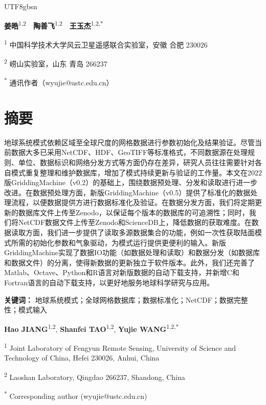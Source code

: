 \documentclass[numdoi]{chinese}
\begin{document}
\doublespacing
\begin{CJK}{UTF8}{gbsn}

%
%
{\centering
\par{}
\normalsize
\par\noindent \textbf{姜皓}\textsuperscript{1,2}　\textbf{陶善飞}\textsuperscript{1,2}　\textbf{王玉杰}\textsuperscript{1,2,*}
\par\noindent \textsuperscript{1} 中国科学技术大学风云卫星遥感联合实验室，安徽 合肥 230026
\par\noindent \textsuperscript{2} 崂山实验室，山东 青岛 266237
\par\noindent \textsuperscript{*} 通讯作者（wyujie@ustc.edu.cn）\\
}


\section*{摘要}
地球系统模式依赖区域至全球尺度的网格数据进行参数初始化及结果验证。尽管当前数据大多已采用NetCDF、HDF、GeoTIFF等标准格式，不同数据源在处理规则、单位、数据标识和网络分发方式等方面仍存在差异，研究人员往往需要针对各自模式重复整理和维护数据库，增加了模式持续更新与验证的工作量。本文在2022版GriddingMachine（v0.2）的基础上，围绕数据预处理、分发和读取进行进一步改进。在数据预处理方面，新版GriddingMachine（v0.5）提供了标准化的数据处理流程，以便数据提供方进行数据标准化及验证。在数据分发方面，我们将定期更新的数据库文件上传至Zenodo，以保证每个版本的数据库的可追溯性；同时，我们将NetCDF数据文件上传至Zenodo和ScienceDB上，降低数据的获取难度。在数据读取方面，我们进一步提供了读取多源数据集合的功能，例如一次性获取陆面模式所需的初始化参数和气象驱动，为模式运行提供更便利的输入。新版GriddingMachine实现了数据IO功能（如数据处理和读取）和数据分发（如数据库和数据文件）的分离，使得新数据的更新独立于软件版本。此外，我们还完善了Matlab、Octave、Python和R语言对新版数据的自动下载支持，并新增C和Fortran语言的自动下载支持，以更好地服务地球科学研究与应用。

\textbf{关键词：} 地球系统模式；全球网格数据库；数据标准化；NetCDF；数据完整性；模式输入


\hspace{10em}
{
\centering
\par{}
\par\noindent \textbf{Hao JIANG}\textsuperscript{1,2}, \textbf{Shanfei TAO}\textsuperscript{1,2}, \textbf{Yujie WANG}\textsuperscript{1,2,*}
\par\noindent \textsuperscript{1} Joint Laboratory of Fengyun Remote Sensing, University of Science and Technology of China, Hefei 230026, Anhui, China
\par\noindent \textsuperscript{2} Laoshan Laboratory, Qingdao 266237, Shandong, China
\par\noindent \textsuperscript{*} Corresponding author (wyujie@ustc.edu.cn)\\
}



\end{CJK}
\end{document}
